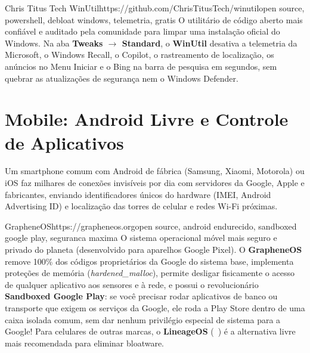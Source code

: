 \documentclass{pousadaguide}
\begin{document}
\begin{ferramenta}[recomendado,logo=winutil]{Chris Titus Tech WinUtil}{https://github.com/ChrisTitusTech/winutil}{open source, powershell, debloat windows, telemetria, gratis}
O utilitário de código aberto mais confiável e auditado pela comunidade para limpar uma instalação oficial do Windows. Na aba \textbf{Tweaks $\rightarrow$ Standard}, o \textbf{WinUtil} desativa a telemetria da Microsoft, o Windows Recall, o Copilot, o rastreamento de localização, os anúncios no Menu Iniciar e o Bing na barra de pesquisa em segundos, sem quebrar as atualizações de segurança nem o Windows Defender. 
\end{ferramenta}


\section{Mobile: Android Livre e Controle de Aplicativos}

Um smartphone comum com Android de fábrica (Samsung, Xiaomi, Motorola) ou iOS faz milhares de conexões invisíveis por dia com servidores da Google, Apple e fabricantes, enviando identificadores únicos do hardware (IMEI, Android Advertising ID) e localização das torres de celular e redes Wi-Fi próximas.

\begin{ferramenta}[goat,logo=grapheneos]{GrapheneOS}{https://grapheneos.org}{open source, android endurecido, sandboxed google play, seguranca maxima}
O sistema operacional móvel mais seguro e privado do planeta (desenvolvido para aparelhos Google Pixel). O \textbf{GrapheneOS} remove 100\% dos códigos proprietários da Google do sistema base, implementa proteções de memória (\emph{hardened\_malloc}), permite desligar fisicamente o acesso de qualquer aplicativo aos sensores e à rede, e possui o revolucionário \textbf{Sandboxed Google Play}: se você precisar rodar aplicativos de banco ou transporte que exigem os serviços da Google, ele roda a Play Store dentro de uma caixa isolada comum, sem dar nenhum privilégio especial de sistema para a Google! Para celulares de outras marcas, o \textbf{LineageOS} (~) é a alternativa livre mais recomendada para eliminar bloatware. 
\end{ferramenta}
\end{document}
